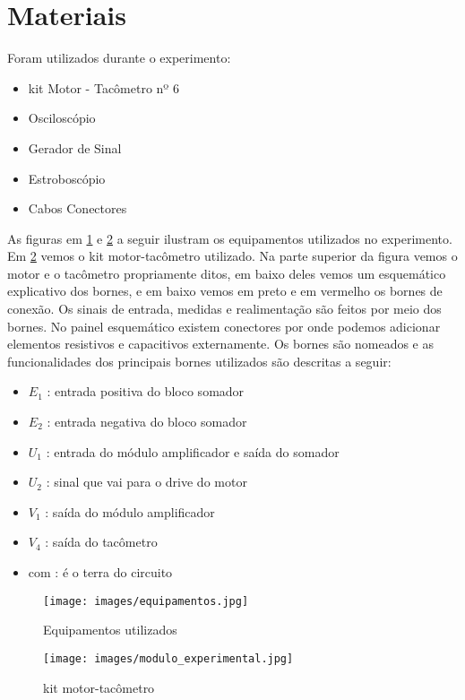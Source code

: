\section{Materiais}

Foram utilizados durante o experimento:

\begin{itemize}
	\item kit Motor - Tacômetro nº 6
    \item Osciloscópio
    \item Gerador de Sinal
    \item Estroboscópio
    \item Cabos Conectores
\end{itemize}

As figuras em \ref{fig:montagem} e \ref{fig:kit} a seguir ilustram os equipamentos utilizados no experimento. Em \ref{fig:kit} vemos o kit motor-tacômetro utilizado. Na parte superior da figura vemos o motor e o tacômetro propriamente ditos, em baixo deles vemos um esquemático explicativo dos bornes, e em baixo vemos em preto e em vermelho os bornes de conexão. Os sinais de entrada, medidas e realimentação são feitos por meio dos bornes. No painel esquemático existem conectores por onde podemos adicionar elementos resistivos e capacitivos externamente. Os bornes são nomeados e as funcionalidades dos principais bornes utilizados são descritas a seguir:

\begin{itemize}
    \item $E_1$ : entrada positiva do bloco somador 
    \item $E_2$ : entrada negativa do bloco somador

	\item $U_1$ : entrada do módulo amplificador e saída do somador
    \item $U_2$ : sinal que vai para o drive do motor
    
    \item $V_1$ : saída do módulo amplificador
	\item $V_4$ : saída do tacômetro

    \item com : é o terra do circuito
\end{itemize}

\begin{figure}[H]
  \centering
	\texttt{[image: images/equipamentos.jpg]}
\caption{Equipamentos utilizados}
\label{fig:montagem}
\end{figure}

\begin{figure}[H]
  \centering
	\texttt{[image: images/modulo\_experimental.jpg]}
\caption{kit motor-tacômetro}
\label{fig:kit}
\end{figure}